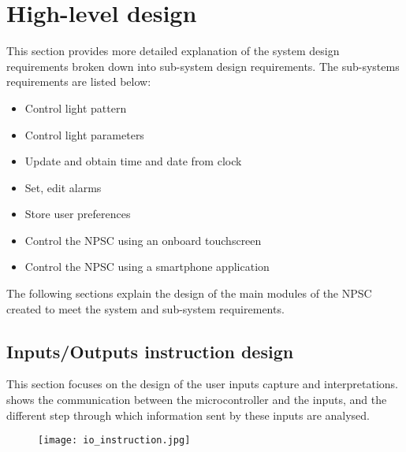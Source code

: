 \section{High-level design}
This section provides more detailed explanation of the system design requirements broken down into sub-system design requirements. The sub-systems requirements are listed below:
\begin{itemize}
\item Control light pattern
\item Control light parameters
\item Update and obtain time and date from clock
\item Set, edit alarms
\item Store user preferences
\item Control the NPSC using an onboard touchscreen
\item Control the NPSC using a smartphone application
\end{itemize}
The following sections explain the design of the main modules of the NPSC created to meet the system and sub-system requirements.

\subsection{Inputs/Outputs instruction design}
This section focuses on the design of the user inputs capture and interpretations.  shows the communication between the microcontroller and the inputs, and the different step through which information sent by these inputs are analysed. 
\begin{figure}[ht]
\centering
\texttt{[image: io\_instruction.jpg]}
\caption{}
\label{fig:io_instruction}
\end{figure}

